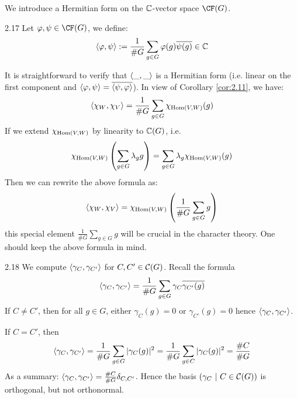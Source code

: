 \documentclass[twoside = false,	%
		headsepline,		%
		parskip = true,
		]{scrbook}						%
\begin{document}
    We introduce a Hermitian form on the $\mathbb C$-vector space $\CF(G)$.
    \begin{definition}{}{2.17}
        Let $\varphi,\psi \in \CF(G)$, we define:
        \begin{equation*}
            \left\langle \varphi,\psi\right\rangle := \frac{1}{\#G} \sum_{g \in G} \varphi(g) \overline{\psi(g)} \in \mathbb C
        \end{equation*}
    \end{definition}
    It is straightforward to verify that $\left\langle \_,\_\right\rangle$ is a Hermitian form (i.e. linear on the first component and $\left\langle \varphi,\psi\right\rangle = \overline{\left\langle \psi,\varphi\right\rangle}$).
    In view of Corollary \ref{cor:2.11}, we have:
    \begin{equation*}
        \left\langle \chi_W,\chi_V\right\rangle = \frac{1}{\#G} \sum_{g \in G} \chi_{\mathrm{Hom}(V,W)}(g)
    \end{equation*}
    If we extend $\chi_{\mathrm{Hom}(V,W)}$ by linearity to $\mathbb C(G)$, i.e.
    \begin{equation*}
        \chi_{\mathrm{Hom}(V,W)}\left( \sum_{g \in G} \lambda_g g\right) = \sum_{g \in G} \lambda_g \chi_{\mathrm{Hom}(V,W)}(g)
    \end{equation*}
    Then we can rewrite the above formula as:
    \begin{equation*}
        \left\langle \chi_W,\chi_V\right\rangle = \chi_{\mathrm{Hom}(V,W)} \left( \frac{1}{\#G} \sum_{g \in G}g\right)
    \end{equation*}
    this special element $\frac{1}{\#G} \sum\limits_{g \in G}g$ will be crucial in the character theory. One should keep the above formula in mind.
    \begin{example}{}{2.18}
        We compute $\left\langle \gamma_C,\gamma_{C'}\right\rangle$ for $C,C' \in \mathcal C(G)$.
        Recall the formula
        \begin{equation*}
            \left\langle \gamma_C,\gamma_{C'}\right\rangle = \frac{1}{\#G} \sum_{g \in G}\gamma_C \overline{\gamma_{C'}(g)}
        \end{equation*}
        If $C \neq C'$, then for all $g \in G$, either $\gamma_C(g) = 0$ or $\gamma_{C'}(g) = 0$ hence $\left\langle \gamma_C,\gamma_{C'}\right\rangle$.
        
        If $C = C'$, then
        \begin{equation*}
            \left\langle \gamma_C,\gamma_{C'}\right\rangle = \frac{1}{\#G}\sum_{g \in G} |\gamma_C(g)|^2 = \frac{1}{\#G} \sum_{g \in C} |\gamma_C(g)|^2 = \frac{\#C}{\#G}
        \end{equation*}
        As a summary: $\left\langle \gamma_C,\gamma_{C'}\right\rangle = \frac{\#C}{\#G} \delta_{C,C'}$. Hence the basis $(\gamma_C \ | \ C \in \mathcal C(G)) $ is orthogonal, but not orthonormal.
    \end{example}
\end{document}
